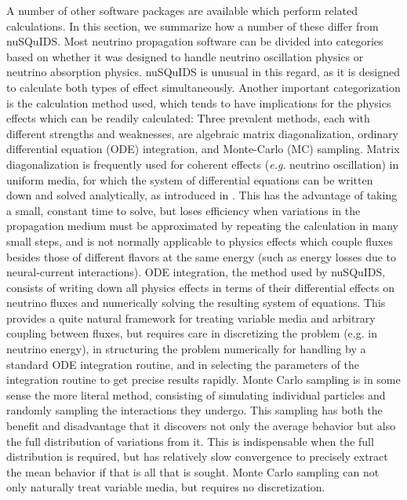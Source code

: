 \documentclass[3p,12pt]{elsarticle}
\newcommand{\ttf}{\ttfamily}
\begin{document}
A number of other software packages are available which perform related calculations. 
In this section, we summarize how a number of these differ from {\ttf nuSQuIDS}. 
Most neutrino propagation software can be divided into categories based on whether it was designed to handle neutrino oscillation physics or neutrino absorption physics. 
{\ttf nuSQuIDS} is unusual in this regard, as it is designed to calculate both types of effect simultaneously. 
Another important categorization is the calculation method used, which tends to have implications for the physics effects which can be readily calculated: 
Three prevalent methods, each with different strengths and weaknesses, are algebraic matrix diagonalization, ordinary differential equation (ODE) integration, and Monte-Carlo (MC) sampling. 
Matrix diagonalization is frequently used for coherent effects (\textit{e.g}. neutrino oscillation) in uniform media, for which the system of differential equations can be written down and solved analytically, as introduced in \cite{barger1980matter}. 
This has the advantage of taking a small, constant time to solve, but loses efficiency when variations in the propagation medium must be approximated by repeating the calculation in many small steps, and is not normally applicable to physics effects which couple fluxes besides those of different flavors at the same energy (such as energy losses due to neural-current interactions). 
ODE integration, the method used by {\ttf nuSQuIDS}, consists of writing down all physics effects in terms of their differential effects on neutrino fluxes and numerically solving the resulting system of equations. 
This provides a quite natural framework for treating variable media and arbitrary coupling between fluxes, but requires care in discretizing the problem (e.g. in neutrino energy), in structuring the problem numerically for handling by a standard ODE integration routine, and in selecting the parameters of the integration routine to get precise results rapidly. 
Monte Carlo sampling is in some sense the more literal method, consisting of simulating individual particles and randomly sampling the interactions they undergo. 
This sampling has both the benefit and disadvantage that it discovers not only the average behavior but also the full distribution of variations from it. 
This is indispensable when the full distribution is required, but has relatively slow convergence to precisely extract the mean behavior if that is all that is sought. 
Monte Carlo sampling can not only naturally treat variable media, but requires no discretization. 
\end{document}
